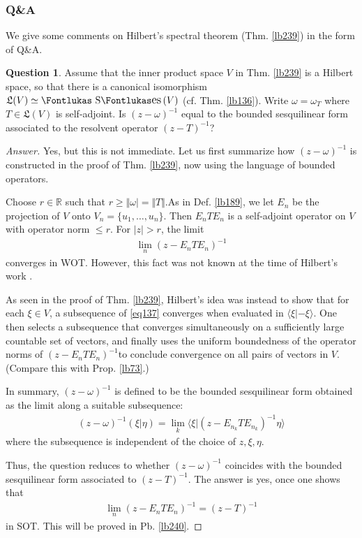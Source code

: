\documentclass[12pt,b5paper,notitlepage]{article}
\theoremstyle{definition}
\newtheorem{question}[df]{Question}
\theoremstyle{plain}
\DeclareMathOperator{\Ses}{\text{\Fontlukas S}\text{\kern -0pt {\Fontlukas\large es}}\,}
\newcommand{\fk}{\mathfrak}
\newcommand{\bk}[1]{\langle {#1}\rangle}
\newcommand{\Rbb}{\mathbb R}
\numberwithin{equation}{section}
\begin{document}
\subsubsection{Q\&A}


We give some comments on Hilbert's spectral theorem (Thm. \ref{lb239}) in the form of Q\&A.


\begin{question}\label{lb242}
Assume that the inner product space $V$ in Thm. \ref{lb239} is a Hilbert space, so that there is a canonical isomorphism $\fk L(V)\simeq\Ses(V)$ (cf. Thm. \ref{lb136}). Write $\omega=\omega_T$ where $T\in\fk L(V)$ is self-adjoint. Is $(z-\omega)^{-1}$ equal to the bounded sesquilinear form associated to the resolvent operator $(z-T)^{-1}$?
\end{question}

\begin{proof}[Answer]
Yes, but this is not immediate. Let us first summarize how $(z-\omega)^{-1}$ is constructed in the proof of Thm. \ref{lb239}, now using the language of bounded operators.

Choose $r\in\Rbb$ such that $r\geq\Vert\omega\vert=\Vert T\Vert$.As in Def. \ref{lb189}, we let $E_n$ be the projection of $V$ onto $V_n=\{u_1,\dots,u_n\}$. Then $E_nTE_n$ is a self-adjoint operator on $V$ with operator norm $\leq r$. For $|z|>r$, the limit
\begin{align}\label{eq137}
\lim_n (z-E_nTE_n)^{-1}
\end{align}
converges in WOT. However, this fact was not known at the time of Hilbert's work \cite{Hil06}. 

As seen in the proof of Thm. \ref{lb239}, Hilbert's idea was instead to show that for each $\xi\in V$, a subsequence of \eqref{eq137} converges when evaluated in $\bk{\xi|-\xi}$. One then selects a subsequence that converges simultaneously on a sufficiently large countable set of vectors, and finally uses the uniform boundedness of the operator norms of $(z-E_nTE_n)^{-1}$to conclude convergence on all pairs of vectors in $V$. (Compare this with Prop. \ref{lb73}.)

In summary, $(z-\omega)^{-1}$ is defined to be the bounded sesquilinear form obtained as the limit along a suitable subsequence:
\begin{align}
(z-\omega)^{-1}(\xi|\eta)=\lim_k \bk{\xi|(z-E_{n_k}TE_{n_k})^{-1}\eta}
\end{align}
where the subsequence is independent of the choice of $z,\xi,\eta$.

Thus, the question reduces to whether $(z-\omega)^{-1}$ coincides with the bounded sesquilinear form associated to $(z-T)^{-1}$. The answer is yes, once one shows that
\begin{align}
\lim_n (z-E_nTE_n)^{-1}=(z-T)^{-1}
\end{align}
in SOT. This will be proved in Pb. \ref{lb240}.
\end{proof}
\end{document}
